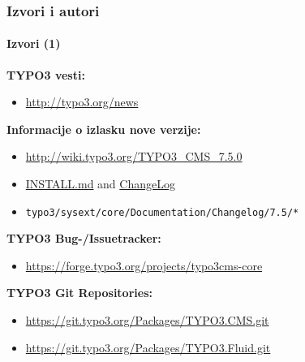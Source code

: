 \begin{frame}[fragile]
	\frametitle{Izvori i autori}
	\framesubtitle{Izvori (1)}

	\textbf{TYPO3 vesti:}
		\begin{itemize}\smaller
			\item \url{http://typo3.org/news}
		\end{itemize}

	\textbf{Informacije o izlasku nove verzije:}
		\begin{itemize}\smaller
			\item \url{http://wiki.typo3.org/TYPO3_CMS_7.5.0}
			\item \href{https://github.com/TYPO3/TYPO3.CMS/blob/master/INSTALL.md}{INSTALL.md} and \href{https://github.com/TYPO3/TYPO3.CMS/blob/master/ChangeLog}{ChangeLog}
			\item \texttt{typo3/sysext/core/Documentation/Changelog/7.5/*}
		\end{itemize}

	\textbf{TYPO3 Bug-/Issuetracker:}
		\begin{itemize}\smaller
			\item \url{https://forge.typo3.org/projects/typo3cms-core}
		\end{itemize}

	\textbf{TYPO3 Git Repositories:}
		\begin{itemize}\smaller
			\item \url{https://git.typo3.org/Packages/TYPO3.CMS.git}
			\item \url{https://git.typo3.org/Packages/TYPO3.Fluid.git}
		\end{itemize}

\end{frame}



